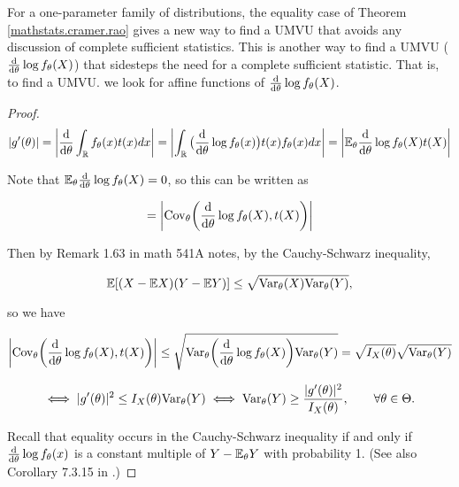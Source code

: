\begin{remark}For a one-parameter family of distributions, the equality case of Theorem \ref{mathstats.cramer.rao} gives a new way to find a UMVU that avoids any discussion of complete sufficient statistics. This is another way to find a UMVU (\(\deriv{}{\theta}  \log f_\theta (X) \)) that sidesteps the need for a complete sufficient statistic. That is, to find a UMVU. we look for affine functions of \(\deriv{}{\theta}  \log f_\theta (X) \).

\end{remark}

\begin{proof}

\[
|g'(\theta)| = \left| \deriv{}{\theta} \int_{\mathbb{R}} f_\theta(x) t(x) dx \right| = \left|  \int_{\mathbb{R}} \big( \deriv{}{\theta} \log f_\theta(x) \big) t(x) f_\theta(x) dx \right| = \left| \E_\theta \deriv{}{\theta} \log f_\theta(X)t(X) \right|
\]

Note that \(\E_\theta \deriv{}{\theta} \log f_\theta(X) = 0\), so this can be written as 

\[
 = \left| \Cov_\theta \bigg(\deriv{}{\theta} \log f_\theta(X), t(X) \bigg) \right|
\]

Then by Remark 1.63 in math 541A notes, by the Cauchy-Schwarz inequality,

\[
\E[ (X - \E X)(Y - \E Y) ] \leq \sqrt{ \Var_\theta(X) \Var_\theta(Y)},
\]

so we have

\[
 \left| \Cov_\theta \bigg(\deriv{}{\theta} \log f_\theta(X), t(X) \bigg) \right| \leq \sqrt{ \Var_\theta \bigg( \deriv{}{\theta} \log f_\theta(X) \bigg) \Var_\theta(Y) } = \sqrt{I_X(\theta)} \sqrt{\Var_\theta(Y)}
\]

\[
\iff |g'(\theta)| ^2 \leq I_X(\theta) \Var_\theta(Y) \iff \Var_\theta(Y) \geq \frac{ |g'(\theta)|^2}{I_X(\theta)}, \qquad \forall \theta \in \Theta.
\]

Recall that equality occurs in the Cauchy-Schwarz inequality if and only if \(\deriv{}{\theta} \log f_\theta(x) \) is a constant multiple of \(Y - \E_\theta Y\)  with probability 1. (See also Corollary 7.3.15 in \citet[p. 341]{CaseBerg:01}.)

\end{proof}

